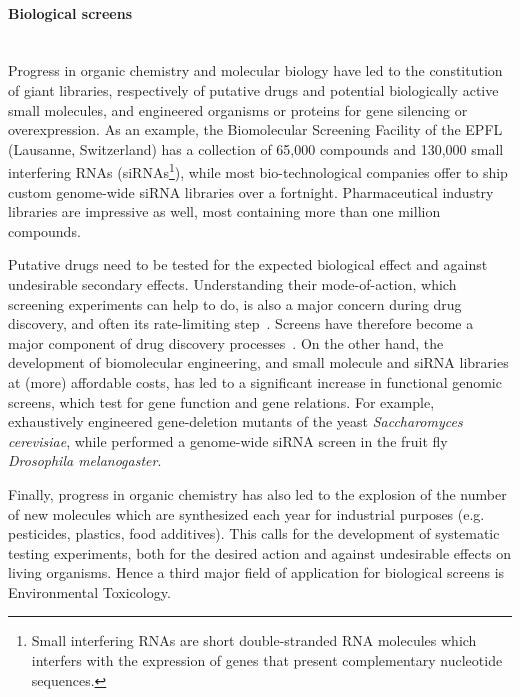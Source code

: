 \paragraph*{Biological screens}~\\
Progress in organic chemistry and molecular biology have led to the constitution of giant libraries, respectively of putative drugs and potential biologically active small molecules, and engineered organisms or proteins for gene silencing or overexpression. As an example, the Biomolecular Screening Facility of the EPFL (Lausanne, Switzerland) has a collection of 65,000 compounds and 130,000 small interfering RNAs (siRNAs\footnote{Small interfering RNAs are short double-stranded RNA molecules which interfers with the expression of genes that present complementary nucleotide sequences.}), while most bio-technological companies offer to ship custom genome-wide siRNA libraries over a fortnight. Pharmaceutical industry libraries are impressive as well, most containing more than one million compounds.

Putative drugs need to be tested for the expected biological effect and against undesirable secondary effects. Understanding their mode-of-action, which screening experiments can help to do, is also a major concern during drug discovery, and often its rate-limiting step~\cite{pmid15547975}. Screens have therefore become a major component of drug discovery processes~\cite{pmid22155864}. On the other hand, the development of biomolecular engineering, and small molecule and siRNA libraries at (more) affordable costs, has led to a significant increase in functional genomic screens, which test for gene function and gene relations. For example, \cite{pmid12140549} exhaustively engineered gene-deletion mutants of the yeast \textit{Saccharomyces cerevisiae}, while \cite{pmid16511445} performed a genome-wide siRNA screen in the fruit fly \textit{Drosophila melanogaster}.

Finally, progress in organic chemistry has also led to the explosion of the number of new molecules which are synthesized each year for industrial purposes (e.g. pesticides, plastics, food additives). This calls for the development of systematic testing experiments, both for the desired action and against undesirable effects on living organisms. Hence a third major field of application for biological screens is Environmental Toxicology.

